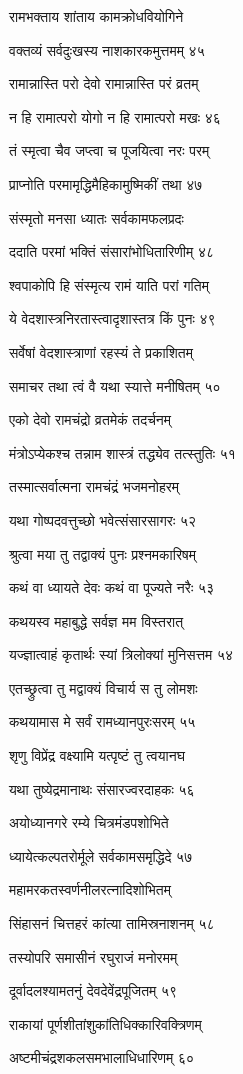रामभक्ताय शांताय कामक्रोधवियोगिने

वक्तव्यं सर्वदुःखस्य नाशकारकमुत्तमम् ४५

रामान्नास्ति परो देवो रामान्नास्ति परं व्रतम्

न हि रामात्परो योगो न हि रामात्परो मखः ४६

तं स्मृत्वा चैव जप्त्वा च पूजयित्वा नरः परम्

प्राप्नोति परमामृद्धिमैहिकामुष्मिकीं तथा ४७

संस्मृतो मनसा ध्यातः सर्वकामफलप्रदः

ददाति परमां भक्तिं संसारांभोधितारिणीम् ४८

श्वपाकोपि हि संस्मृत्य रामं याति परां गतिम्

ये वेदशास्त्रनिरतास्त्वादृशास्तत्र किं पुनः ४९

सर्वेषां वेदशास्त्राणां रहस्यं ते प्रकाशितम्

समाचर तथा त्वं वै यथा स्यात्ते मनीषितम् ५०

एको देवो रामचंद्रो व्रतमेकं तदर्चनम्

मंत्रोऽप्येकश्च तन्नाम शास्त्रं तद्ध्येव तत्स्तुतिः ५१

तस्मात्सर्वात्मना रामचंद्रं भजमनोहरम्

यथा गोष्पदवत्तुच्छो भवेत्संसारसागरः ५२

श्रुत्वा मया तु तद्वाक्यं पुनः प्रश्नमकारिषम्

कथं वा ध्यायते देवः कथं वा पूज्यते नरैः ५३

कथयस्व महाबुद्धे सर्वज्ञ मम विस्तरात्

यज्ज्ञात्वाहं कृतार्थः स्यां त्रिलोक्यां मुनिसत्तम ५४

एतच्छ्रुत्वा तु मद्वाक्यं विचार्य स तु लोमशः

कथयामास मे सर्वं रामध्यानपुरःसरम् ५५

शृणु विप्रेंद्र वक्ष्यामि यत्पृष्टं तु त्वयानघ

यथा तुष्येद्रमानाथः संसारज्वरदाहकः ५६

अयोध्यानगरे रम्ये चित्रमंडपशोभिते

ध्यायेत्कल्पतरोर्मूले सर्वकामसमृद्धिदे ५७

महामरकतस्वर्णनीलरत्नादिशोभितम्

सिंहासनं चित्तहरं कांत्या तामिस्रनाशनम् ५८

तस्योपरि समासीनं रघुराजं मनोरमम्

दूर्वादलश्यामतनुं देवदेवेंद्रपूजितम् ५९

राकायां पूर्णशीतांशुकांतिधिक्कारिवक्त्रिणम्

अष्टमीचंद्रशकलसमभालाधिधारिणम् ६०

